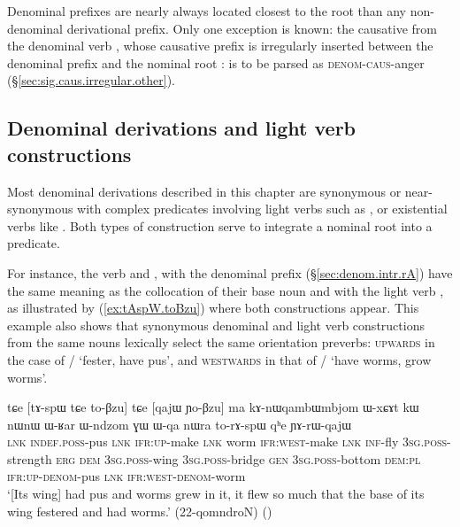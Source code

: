 Denominal prefixes are nearly always located closest to the root than any non-denominal derivational prefix. Only one exception is known: the causative  from the denominal verb , whose causative prefix is irregularly inserted between the denominal prefix  and the nominal root :  is to be parsed as  \textsc{denom}-\textsc{caus}-anger  (§\ref{sec:sig.caus.irregular.other}).

\subsection{Denominal derivations and light verb constructions} \label{sec:denominal.vs.light.verb}
Most denominal derivations described in this chapter are synonymous or near-synonymous with complex predicates involving light verbs such as ,  or existential verbs like . Both types of construction serve to integrate a nominal root into a predicate. 
 
For instance, the verb  and  , with the  denominal prefix (§\ref{sec:denom.intr.rA}) have the same meaning as the collocation of their base noun  and  with the light verb , as illustrated by (\ref{ex:tAspW.toBzu}) where both constructions appear. This example also shows that synonymous denominal and light verb constructions from the same nouns lexically select the same orientation preverbs: \textsc{upwards} in the case of / `fester, have pus', and \textsc{westwards} in that of / `have worms, grow worms'.
 
 \begin{exe}
\ex \label{ex:tAspW.toBzu}
 \gll tɕe [tɤ-spɯ tɕe to-βzu] tɕe [qajɯ ɲo-βzu] ma kɤ-nɯqambɯmbjom ɯ-xɕɤt kɯ nɯnɯ ɯ-ʁar ɯ-ndzom ɣɯ ɯ-qa nɯra to-rɤ-spɯ qʰe ɲɤ-rɯ-qajɯ \\
 \textsc{lnk} \textsc{indef}.\textsc{poss}-pus \textsc{lnk} \textsc{ifr}:\textsc{up}-make \textsc{lnk} worm \textsc{ifr}:\textsc{west}-make \textsc{lnk} \textsc{inf}-fly \textsc{3sg}.\textsc{poss}-strength \textsc{erg} \textsc{dem} \textsc{3sg}.\textsc{poss}-wing \textsc{3sg}.\textsc{poss}-bridge \textsc{gen} \textsc{3sg}.\textsc{poss}-bottom \textsc{dem}:\textsc{pl} \textsc{ifr}:\textsc{up}-\textsc{denom}-pus \textsc{lnk} \textsc{ifr}:\textsc{west}-\textsc{denom}-worm \\
\glt `[Its wing] had pus and worms grew in it, it flew so much that the base of its wing festered and had worms.' (22-qomndroN)
()
  \end{exe}
  
